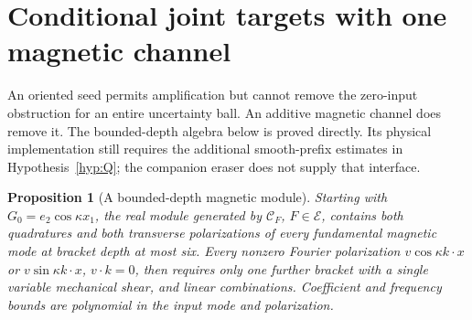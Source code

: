 \documentclass[11pt,a4paper]{amsart}
\newtheorem{proposition}[theorem]{Proposition}
\theoremstyle{definition}
\theoremstyle{remark}
\numberwithin{equation}{section}
\newcommand{\Ccal}{\mathcal C}
\begin{document}
\section{Conditional joint targets with one magnetic channel}\label{sec:channel}

An oriented seed permits amplification but cannot remove the zero-input obstruction for an entire uncertainty ball. An additive magnetic channel does remove it. The bounded-depth algebra below is proved directly. Its physical implementation still requires the additional smooth-prefix estimates in Hypothesis~\ref{hyp:Q}; the companion eraser does not supply that interface.

\begin{proposition}[A bounded-depth magnetic module]\label{prop:module}
Starting with $G_0=e_2\cos\kappa x_1$, the real module generated by $\Ccal_F$, $F\in\mathcal E$, contains both quadratures and both transverse polarizations of every fundamental magnetic mode at bracket depth at most six. Every nonzero Fourier polarization $v\cos\kappa k\cdot x$ or $v\sin\kappa k\cdot x$, $v\cdot k=0$, then requires only one further bracket with a single variable mechanical shear, and linear combinations. Coefficient and frequency bounds are polynomial in the input mode and polarization.
\end{proposition}
\end{document}
